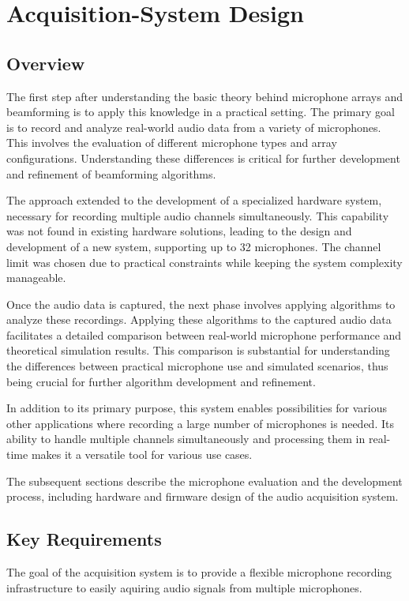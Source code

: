\chapter{Acquisition-System Design}
\section{Overview}
The first step after understanding the basic theory behind microphone arrays and beamforming is to apply this knowledge in a practical setting.
The primary goal is to record and analyze real-world audio data from a variety of microphones.
This involves the evaluation of different microphone types and array configurations.
Understanding these differences is critical for further development and refinement of beamforming algorithms.

The approach extended to the development of a specialized hardware system, necessary for recording multiple audio channels simultaneously.
This capability was not found in existing hardware solutions, leading to the design and development of a new system, supporting up to 32 microphones.
The channel limit was chosen due to practical constraints while keeping the system complexity manageable.

Once the audio data is captured, the next phase involves applying algorithms to analyze these recordings.
Applying these algorithms to the captured audio data facilitates a detailed comparison between real-world microphone performance and theoretical simulation results.
This comparison is substantial for understanding the differences between practical microphone use and simulated scenarios, thus being crucial for further algorithm development and refinement.

In addition to its primary purpose, this system enables possibilities for various other applications where recording a large number of microphones is needed.
Its ability to handle multiple channels simultaneously and processing them in real-time makes it a versatile tool for various use cases.

The subsequent sections describe the microphone evaluation and the development process, including hardware and firmware design of the audio acquisition system.

\newpage
\section{Key Requirements}
The goal of the acquisition system is to provide a flexible microphone recording infrastructure to easily aquiring audio signals from multiple microphones.

